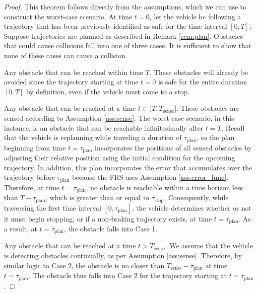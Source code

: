 \begin{proof}
This theorem follows directly from the assumptions, which we can use to construct the worst-case scenario.
At time $t = 0$, let the vehicle be following a trajectory that has been previously identified as safe for the time interval $[0,T]$.
Suppose trajectories are planned as described in Remark \ref{rem:plan}.
Obstacles that could cause collisions fall into one of three cases. 
It is sufficient to show that none of these cases can cause a collision.

 Any obstacle that can be reached within time $T$.
These obstacles will already be avoided since the trajectory starting at time $t = 0$ is safe for the entire duration $[0,T]$ by definition, even if the vehicle must come to a stop.

 Any obstacle that can be reached at a time $t \in (T,T_\text{sense}]$.
These obstacles are sensed according to Assumption \ref{ass:sense}.
The worst-case scenario, in this instance, is an obstacle that can be reachable infinitesimally after $t = T$.
Recall that the vehicle is replanning while traveling a duration of $\tau_\text{plan}$, so the plan beginning from time $t = \tau_\text{plan}$ incorporates the positions of all sensed obstacles by adjusting their relative position using the initial condition for the upcoming trajectory.
In addition, this plan incorporates the error that accumulates over the trajectory before $\tau_\text{plan}$ because the FRS uses Assumption \ref{ass:error_func}.
Therefore, at time $t = \tau_\text{plan}$, no obstacle is reachable within a time horizon less than $T - \tau_\text{plan}$, which is greater than or equal to $\tau_\text{stop}$.
Consequently, while traversing the first time interval $[0,\tau_\text{plan}]$, the vehicle determines whether or not it must begin stopping, or if a non-braking trajectory exists, at time $t = \tau_\text{plan}$.
As a result, at $t = \tau_\text{plan}$, the obstacle falls into Case 1.

 Any obstacle that can be reached at a time $t > T_\text{sense}$.
We assume that the vehicle is detecting obstacles continually, as per Assumption \ref{ass:sense}.
Therefore, by similar logic to Case 2, the obstacle is no closer than $T_\text{sense} - \tau_\text{plan}$ at time $t = \tau_\text{plan}$.
The obstacle thus falls into Case 2 for the trajectory starting at $t = \tau_\text{plan}$.
\end{proof}

